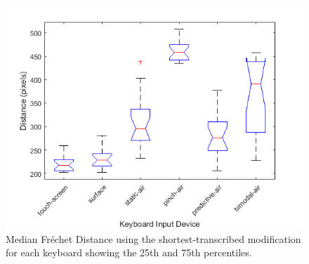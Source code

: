 \begin{figure}[t]
	\centering
	\includegraphics{Figures/fig_frechet_short_boxplot}
	\caption[Fr\'echet Distance Boxplot for Modified-shortest]{Median Fr\'echet Distance using the shortest-transcribed modification for each keyboard showing the 25th and 75th percentiles.}
	\label{fig_frechet_short_boxplot}
\end{figure}

